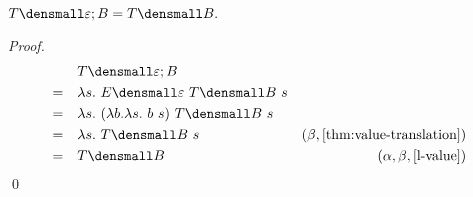 
\begin{lemma}
  \label{thm:tmpl-compose-id-left}
  $ T\den{\varepsilon; B} = T\den{B}.$
\end{lemma}
    \begin{proof}
        \begin{align*}
            &\quad T\den{\varepsilon; B} \\
            =& \quad \lambda s. ~ E\den{\varepsilon} ~T\den{B} ~s \\
            =& \quad \lambda s. ~ (\lambda b. \lambda s.~ b ~s) ~T\den{B} ~s \\
            =& \quad \lambda s. ~ T\den{B} ~s & (\beta, \cref{thm:value-translation})\\
            =& \quad T\den{B} & (\alpha, \beta, \cref{l-value})
        \end{align*}
        \qed
    \end{proof}


